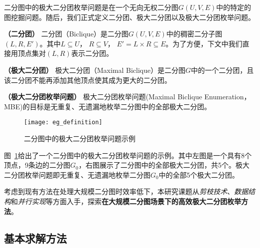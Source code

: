   二分图中的极大二分团枚举问题是在一个无向无权二分图$G(U,V,E)$中的特定的图挖掘问题。随后，我们正式定义二分团、极大二分团以及极大二分团枚举问题。

\begin{definition}
  \textbf{（二分团）} 二分团（Biclique）是二分图$G(U,V,E)$中的稠密二分子图$(L,R,E')$。其中$L\subseteq U$， $R\subseteq V$， $E' = L \times R \subseteq E$。为了方便，下文中我们直接用顶点集对$(L,R)$表示二分团。
\end{definition}

\begin{definition}
  \textbf{（极大二分团）} 极大二分团（Maximal Biclique）是二分图$G$中的一个二分团，且该二分团不能再添加其他顶点使其成为更大的二分团。
  \label{def:mb}
\end{definition}

\begin{definition}
  \textbf{（极大二分团枚举问题）} 极大二分团枚举问题(Maximal Biclique Enumeration， MBE)的目标是无重复、无遗漏地枚举二分图中的全部极大二分团。
\end{definition}

\begin{figure} [ht]
  \centering
  \texttt{[image: eg\_definition]}
  \vspace{0.1 in}
  \caption{二分图中的极大二分团枚举问题示例}
  \label{fig:eg_definition}
\end{figure}

\begin{example}
  图~\ref{fig:eg_definition}给出了一个二分图中的极大二分团枚举问题的示例。其中左图是一个具有8个顶点，9条边的二分图$G_0$，右图展示了二分图中的全部极大二分团，共5个。极大二分团枚举问题即无重复、无遗漏地枚举二分图$G_0$中的全部5个极大二分团。
  
\end{example}

考虑到现有方法在处理大规模二分图时效率低下，本研究课题从\emph{剪枝技术}、\emph{数据结} \emph{构}和\emph{并行实现}等方面入手，探索\textbf{在大规模二分图场景下的高效极大二分团枚举方法}。





\subsection{基本求解方法}
\label{subsec:baseline}
  
